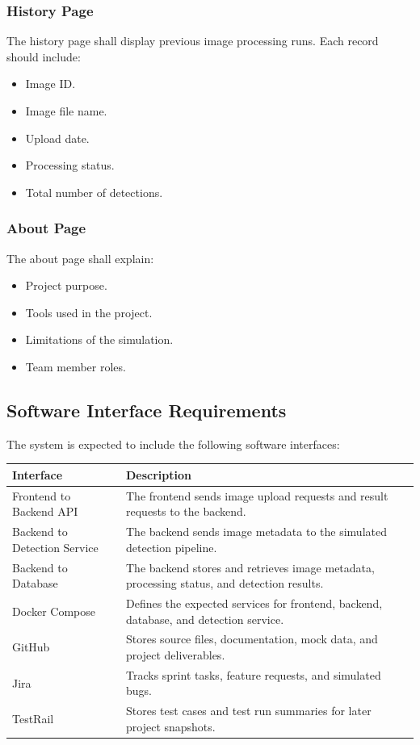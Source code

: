 \documentclass[12pt]{article}
\begin{document}
\subsubsection{History Page}

The history page shall display previous image processing runs. Each record should include:

\begin{itemize}
    \item Image ID.
    \item Image file name.
    \item Upload date.
    \item Processing status.
    \item Total number of detections.
\end{itemize}

\subsubsection{About Page}

The about page shall explain:

\begin{itemize}
    \item Project purpose.
    \item Tools used in the project.
    \item Limitations of the simulation.
    \item Team member roles.
\end{itemize}

\subsection{Software Interface Requirements}

The system is expected to include the following software interfaces:

\begin{longtable}{|p{1.7in}|p{4.3in}|}
\hline
\textbf{Interface} & \textbf{Description} \\
\hline
Frontend to Backend API & The frontend sends image upload requests and result requests to the backend. \\
\hline
Backend to Detection Service & The backend sends image metadata to the simulated detection pipeline. \\
\hline
Backend to Database & The backend stores and retrieves image metadata, processing status, and detection results. \\
\hline
Docker Compose & Defines the expected services for frontend, backend, database, and detection service. \\
\hline
GitHub & Stores source files, documentation, mock data, and project deliverables. \\
\hline
Jira & Tracks sprint tasks, feature requests, and simulated bugs. \\
\hline
TestRail & Stores test cases and test run summaries for later project snapshots. \\
\hline
\end{longtable}
\end{document}
